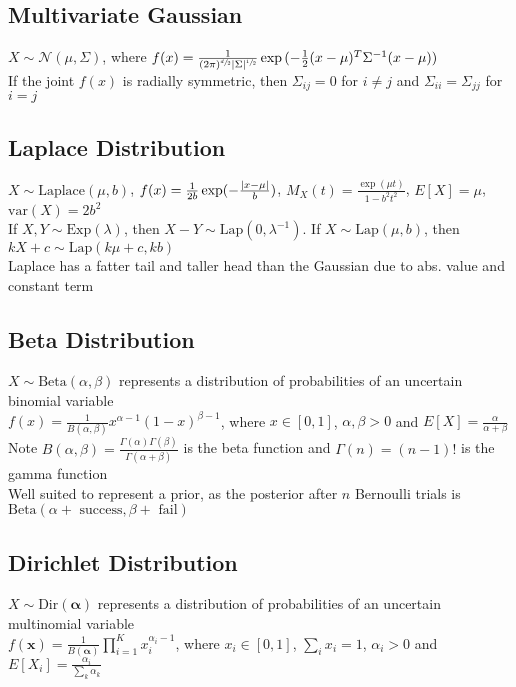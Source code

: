 \documentclass{article}
\newcommand{\V}{\mbox{var}}
\DeclarePairedDelimiter\abs{\lvert}{\rvert}
\begin{document}
\subsection{Multivariate Gaussian}
$X\sim \mathcal{N}(\mu, \Sigma)$, where $f({x}) = \frac{1}{(2\pi)^{\sfrac{d}{2}} \abs{\Sigma}^{\sfrac{1}{2}}}\exp{(-\frac{1}{2}(x-\mu)^T  \Sigma^{-1} ( x- \mu))}$ \\
If the joint $f( x)$ is radially symmetric, then $\Sigma_{ij} = 0$ for $i \neq j$ and $\Sigma_{ii} = \Sigma_{jj}$ for $i = j$

\subsection{Laplace Distribution}
$X \sim \mbox{Laplace}(\mu, b)$, $f(x) = \frac{1}{2b} \exp (-\frac{\abs{x - \mu}}{b})$, $M_X(t) = \frac{\exp(\mu t)}{1 - b^2t^2}$, $E[X] = \mu$, $\V(X) = 2b^2$ \\
If $X, Y \sim \mbox{Exp}(\lambda)$, then $X - Y \sim \mbox{Lap}(0, \lambda ^{-1})$. If $X \sim \mbox{Lap}(\mu, b)$, then $kX + c \sim \mbox{Lap}(k\mu + c, kb)$ \\
Laplace has a fatter tail and taller head than the Gaussian due to abs. value and constant term

\subsection{Beta Distribution}
$X \sim \mbox{Beta}(\alpha, \beta)$ represents a distribution of probabilities of an uncertain binomial variable \\
$f(x) = \frac{1}{B(\alpha, \beta)}x^{\alpha -1}(1-x)^{\beta - 1}$, where $x \in [0, 1]$, $\alpha, \beta > 0$ and $E[X] = \frac{\alpha}{\alpha + \beta}$ \\
Note $B(\alpha, \beta) = \frac{\Gamma(\alpha)\Gamma(\beta)}{\Gamma(\alpha + \beta)}$ is the beta function and $\Gamma(n) = (n-1)!$ is the gamma function \\
Well suited to represent a prior, as the posterior after $n$ Bernoulli trials is $\mbox{Beta}(\alpha + \mbox{ success}, \beta + \mbox{ fail})$

\subsection{Dirichlet Distribution}
$X \sim \mbox{Dir}(\boldsymbol \alpha)$ represents a distribution of probabilities of an uncertain multinomial variable \\
$f(\boldsymbol x) = \frac{1}{B(\boldsymbol \alpha)} \prod\limits_{i=1}^Kx_{i}^{\alpha_i -1}$, where $x_i \in [0, 1]$, $\sum_i x_i = 1$, $\alpha_i > 0$ and $E[X_i] = \frac{\alpha_i}{\sum_k \alpha_k}$
\end{document}

